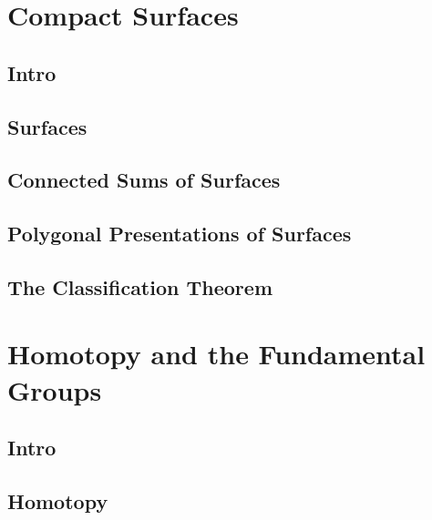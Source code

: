 
\section{Compact Surfaces}
\label{subsection-compact-surfaces}

\subsection{Intro}
\label{subsection-compact-surfaces-intro}

\subsection{Surfaces}
\label{subsection-surfaces}

\subsection{Connected Sums of Surfaces}
\label{subsection-connected-sums-of-surfaces}

\subsection{Polygonal Presentations of Surfaces}
\label{subsection-polygonal-presentations-of-surfaces}

\subsection{The Classification Theorem}
\label{subsection-compact-surfaces-the-classification-theorem}


\section{Homotopy and the Fundamental Groups}
\label{section-homotopy-and-the-fundamental-groups}

\subsection{Intro}
\label{section-intro}

\subsection{Homotopy}
\label{subsection-homotopy}

